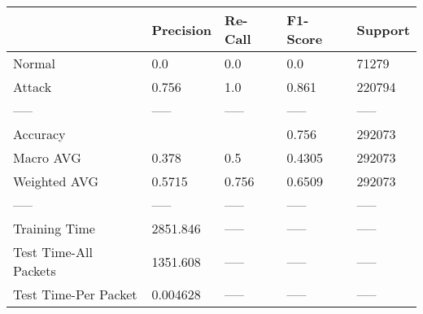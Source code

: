 \begin{tabular}{lllll}
\toprule
{} & Precision & Re-Call & F1-Score & Support \\
\midrule
Normal                &       0.0 &     0.0 &      0.0 &   71279 \\
Attack                &     0.756 &     1.0 &    0.861 &  220794 \\
-----                 &     ----- &   ----- &    ----- &   ----- \\
Accuracy              &           &         &    0.756 &  292073 \\
Macro AVG             &     0.378 &     0.5 &   0.4305 &  292073 \\
Weighted AVG          &    0.5715 &   0.756 &   0.6509 &  292073 \\
-----                 &     ----- &   ----- &    ----- &   ----- \\
Training Time         &  2851.846 &   ----- &    ----- &   ----- \\
Test Time-All Packets &  1351.608 &   ----- &    ----- &   ----- \\
Test Time-Per Packet  &  0.004628 &   ----- &    ----- &   ----- \\
\bottomrule
\end{tabular}
